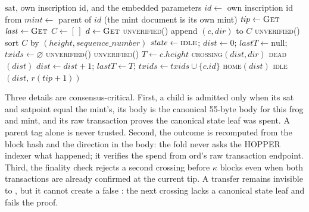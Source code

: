 \begin{algorithm}[htbp]
\caption{The canonical proof-checking fold}\label{alg:fold}
\begin{algorithmic}[1]
\Require $\mathrm{sat}$, own inscription id, and the embedded parameters
\State $\mathit{id}\gets$ own inscription id from 
\State $\mathit{mint}\gets$ parent of $\mathit{id}$ (the mint document is its own mint)
\State $\mathit{tip}\gets \textsc{Get}$
\State $\mathit{last}\gets \textsc{Get}$
\State $C\gets [\,]$
    \State $d\gets \textsc{Get}$
          \State \Return \textsc{unverified}()
        \EndIf
        \State append $(c,\mathit{dir})$ to $C$
      \EndIf
    \EndIf
  \EndFor
\EndFor
{}
  \State \Return \textsc{unverified}()
\EndIf
\State sort $C$ by $(\mathit{height},\mathit{sequence\_number})$
\State $\mathit{state}\gets \textsc{idle}$;\quad
       $\mathit{dist}\gets 0$;\quad
       $\mathit{lastT}\gets \text{null}$;\quad $\mathit{txids}\gets \varnothing$
    \State \Return \textsc{unverified}()
  \EndIf
    \State \Return \textsc{unverified}()
  \EndIf
  \State $T\gets c.\mathit{height}$
    \State \Return \textsc{crossing}$(\mathit{dist},\mathit{dir})$
  \EndIf
    \State \Return \textsc{dead}$(\mathit{dist})$
  \EndIf
  \State $\mathit{dist}\gets \mathit{dist}+1$;\quad
         $\mathit{lastT}\gets T$;\quad
         $\mathit{txids}\gets\mathit{txids}\cup\{c.\mathit{id}\}$
    \State \Return \textsc{home}$(\mathit{dist})$
  \EndIf
\EndFor
\State \Return \textsc{idle}$(\mathit{dist},\,
       r(\mathit{tip}+1))$
\end{algorithmic}
\end{algorithm}

Three details are consensus-critical. First, a child is admitted only when
its sat and satpoint equal the mint's, its body is the canonical 55-byte body
for this frog and mint, and its raw transaction proves the canonical state
leaf was spent. A parent tag alone is never trusted. Second, the outcome is
recomputed from the block hash and the direction in the body: the fold never
asks the HOPPER indexer what happened; it verifies the spend from ord's raw
transaction endpoint. Third, the finality check rejects a second crossing
before $\kappa$ blocks even when both transactions are already confirmed at
the current tip. A transfer remains invisible to , but it cannot
create a false : the next crossing lacks a canonical state leaf
and fails the proof.

